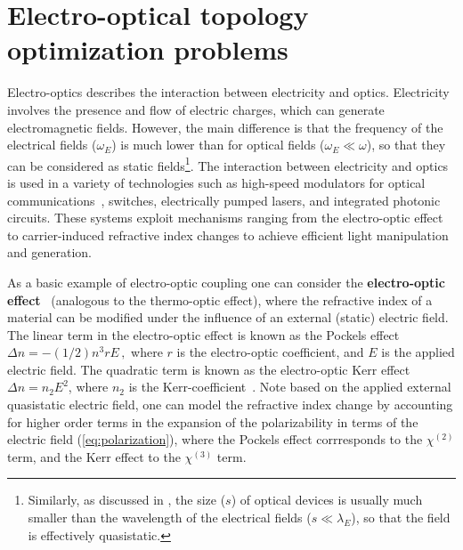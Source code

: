 \chapter{Electro-optical topology optimization problems}\label{chap:eo}
Electro-optics describes the interaction between electricity and optics. Electricity involves the presence and flow of electric charges, which can generate electromagnetic fields.
However, the main difference is that the frequency of the electrical fields ($\omega_E$)
is much lower than for optical fields ($\omega_E \ll \omega $), so that they can be considered as static fields\footnote{Similarly, as discussed in , the size ($s$) of optical devices
is usually much smaller than the wavelength of the electrical fields ($s\ll \lambda_E $), so that the field is effectively quasistatic.}.
The interaction between electricity and optics is used in a variety of technologies such as high-speed modulators for optical communications~\cite{modu, modu1, modu2, pockels}, switches\cite{eo_switch}, electrically pumped lasers\cite{laser,laser_pic}, and integrated photonic circuits\cite{laser_pic}. 
These systems exploit mechanisms ranging from the electro-optic effect~\cite{eo_effect} to carrier-induced refractive index
 changes \cite{c_i_n} to achieve efficient light manipulation and generation.

As a basic example of electro-optic coupling one can consider the \textbf{electro-optic effect}~\cite{eo_effect} (analogous to the thermo-optic effect),
where the refractive index of a material can be modified under the influence of an external (static) electric field. The linear term in the electro-optic effect is known as the
Pockels effect~\cite{pockels} $
    \Delta n = -(1/2) n^3 r E\,,$
where $r$ is the electro-optic coefficient, and $E$ is the applied electric field. The quadratic term 
is known as the electro-optic Kerr effect $\Delta n = n_2 E^2$, where $n_2$ is the Kerr-coefficient~\cite{phot_crys}. Note based on the applied external
quasistatic electric field, one can model the refractive index change by accounting for higher order terms in the expansion of the polarizability
in terms of the electric field (\eqref{eq:polarization}), where the Pockels effect corrresponds to the $\chi^{(2)}$ term, and the Kerr effect to the $\chi^{(3)}$ term.

